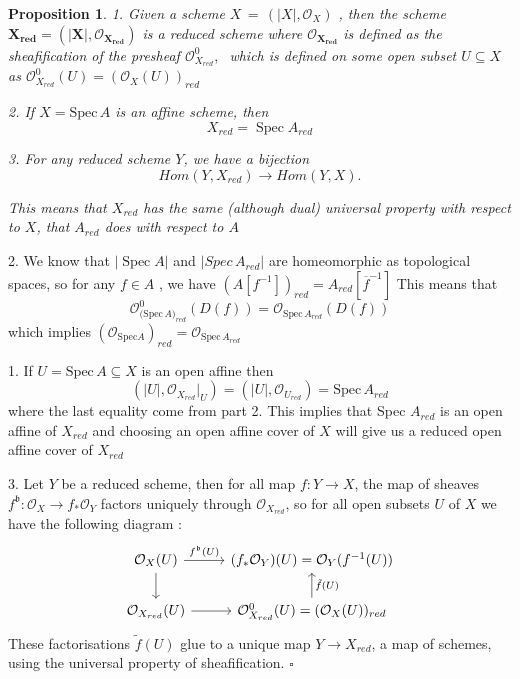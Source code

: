 \documentclass{article}
\newtheorem{proposition}[theorem]{Proposition}
\newenvironment{Proof}{{\noindent \indent \it Proof:\quad}}{\hfill $\square$\par}
\begin{document}
\begin{proposition}
1. Given a scheme $X\,=\,(|X|,{\mathcal O}_{X})$ , then the scheme $\bm{X_{r e d}=(|X|,{\mathcal O}_{X_{red}})}$ is a reduced scheme where $\bm{\mathcal O_{X_{red}}}$ is defined as the sheafification of the presheaf ${\mathcal{O}}_{X_{r e d}}^{0},\;$ which is defined
on some open subset $U\subseteq X$ as  
${\mathcal{O}}_{X_{r e d}}^{0}(U)=({\mathcal{O}}_{X}(U))_{r e d}$ 

2. If $X={\mathrm{Spec}}\,A$ is an affine scheme, then
$$
X_{r e d}=\operatorname{Spec}A_{r e d}
$$

3. For any reduced scheme $Y$, we have a bijection
$$
H o m(Y,X_{r e d})\longrightarrow H o m(Y,X). 
$$

This means that $X_{r e d}$ has the same (although dual) universal property with respect to $X$, that $A_{red}$ does with respect to $A$ 
\end{proposition}
\begin{Proof}
2. We know that $|\operatorname{Spec}A|$ and $|Spec\,A_{r e d}|$ are homeomorphic as topological spaces, so for any $f\in A$ , we have $(A[f^{-1}])_{r e d}=A_{r e d}[\overline{{{f}}}^{-1}]$  This means that
$$
{\mathcal{O}}_{\mathrm{(Spec}\,A)_{r e d}}^{0}(D(f))={\mathcal{O}}_{\mathrm{Spec}\,A_{red}}(D(f))
$$ 
which implies $({\mathcal O}_{\mathrm{Spec}A})_{r e d}={\mathcal O}_{\mathrm{Spec}\,A_{r e d}}$ 

1. If $U={\mathrm{Spec}}\,A\subseteq X$ is an open affine then
$$
(|U|,{\mathcal{O}}_{X_{r e d}}|_U)=(|U|,{\mathcal{O}}_{U_{r e d}})={\mathrm{Spec}}\,A_{r e d} 
$$
where the last equality come from part 2. This implies that Spec $A_{r e d}$ is an open affine of $X_{r e d}$ and choosing an open affine cover of $X$ will give us a reduced open affine cover of $X_{red}$ 

3. Let $Y$ be a reduced scheme, then for all map $f : Y \to X$, the map of sheaves $f^{\mathfrak b} :\mathcal O_X \to f_\ast\mathcal O_Y$
factors uniquely through $\mathcal O_{X_{red}}$, so for all open subsets $U$ of $X$ we have the following diagram :
\[\begin{tikzcd}
	{\mathcal O_{X}(U)} & {(f_\ast\mathcal O_Y)(U)=\mathcal O_Y(f^{-1}(U))} \\
	{\mathcal O_{X_{red}}(U)} & {\mathcal O_{X_{red}}^0(U)=(\mathcal O_{X}(U))_{red}}
	\arrow[from=1-1, to=2-1]
	\arrow[from=2-1, to=2-2]
	\arrow["{f^{\mathfrak b}(U)}", from=1-1, to=1-2]
	\arrow["{\tilde f(U)}"', from=2-2, to=1-2]
\end{tikzcd}\]
These factorisations $\tilde f(U)$ glue to a unique map $Y \rightarrow X_{red}$, a map of schemes, using the universal
property of sheafification.
\end{Proof}
\end{document}
